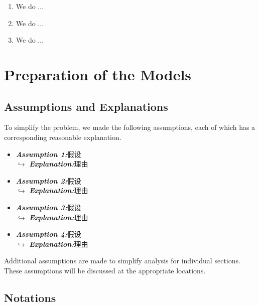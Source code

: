 \documentclass[12pt]{ctexart}
\begin{document}
\begin{enumerate}[\bfseries 1.]
	\item We do ...
	\item We do ...
	\item We do ...
\end{enumerate}

\section{Preparation of the Models}
\subsection{Assumptions and Explanations}

To simplify the problem, we made the following assumptions, each of which has a corresponding reasonable explanation.
\begin{itemize}
	\item \textit{\textbf{Assumption 1:}}假设\\$\hookrightarrow$ \textit{\textbf{Explanation:}}理由

	\item \textit{\textbf{Assumption 2:}}假设\\$\hookrightarrow$ \textit{\textbf{Explanation:}}理由

	\item \textit{\textbf{Assumption 3:}}假设\\$\hookrightarrow$ \textit{\textbf{Explanation:}}理由

	\item \textit{\textbf{Assumption 4:}}假设\\$\hookrightarrow$ \textit{\textbf{Explanation:}}理由
\end{itemize}
Additional assumptions are made to simplify analysis for individual sections. These assumptions will be discussed at the appropriate locations.

\subsection{Notations}%
\end{document}
